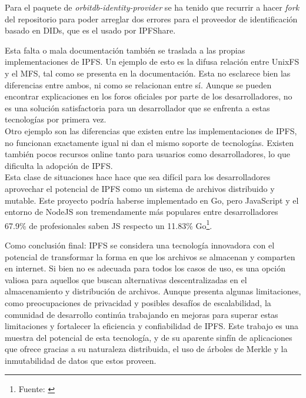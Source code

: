 Para el paquete de \textit{orbitdb-identity-provider} se ha tenido que recurrir a hacer \textit{fork} del repositorio para poder arreglar
dos errores para el proveedor de identificación basado en DIDs, que es el usado por IPFShare.

Esta falta o mala documentación también se traslada a las propias implementaciones de IPFS. Un ejemplo de esto es la difusa relación entre UnixFS y el MFS, tal como se presenta en la documentación. Esta no esclarece bien las diferencias entre ambos, ni como se relacionan entre sí. Aunque se pueden encontrar explicaciones en los foros oficiales
por parte de los desarrolladores\cite{ItPossibleShare}, no es una solución satisfactoria para un desarrollador que se enfrenta a estas tecnologías por primera vez.
\\Otro ejemplo son las diferencias que existen entre las implementaciones de IPFS, no funcionan exactamente igual ni dan el mismo soporte de tecnologías. Existen también pocos recursos online tanto para usuarios como desarrolladores, lo que dificulta la adopción de IPFS.
\\Esta clase de situaciones hace hace que sea difícil para los desarrolladores aprovechar el potencial de IPFS como un sistema de archivos distribuido y mutable. Este proyecto podría haberse implementado en Go, pero JavaScript y el entorno de NodeJS son tremendamente más populares entre desarrolladores 67.9\% de profesionales saben JS respecto un 11.83\% Go\footnote{Fuente: \cite{StackOverflowDeveloper}}.

Como conclusión final: IPFS se considera una tecnología innovadora con el potencial de transformar la forma en que los archivos se almacenan y comparten en internet. Si bien no es adecuada para todos los casos de uso, es una opción valiosa para aquellos que buscan alternativas descentralizadas en el almacenamiento y distribución de archivos. Aunque presenta algunas limitaciones, como preocupaciones de privacidad y posibles desafíos de escalabilidad, la comunidad de desarrollo continúa trabajando en mejoras para superar estas limitaciones y fortalecer la eficiencia y confiabilidad de IPFS. Este trabajo es una muestra del potencial de esta tecnología, y de su aparente sinfín de aplicaciones que ofrece gracias a su naturaleza distribuida, el uso de árboles de Merkle y la inmutabilidad de datos que estos proveen.